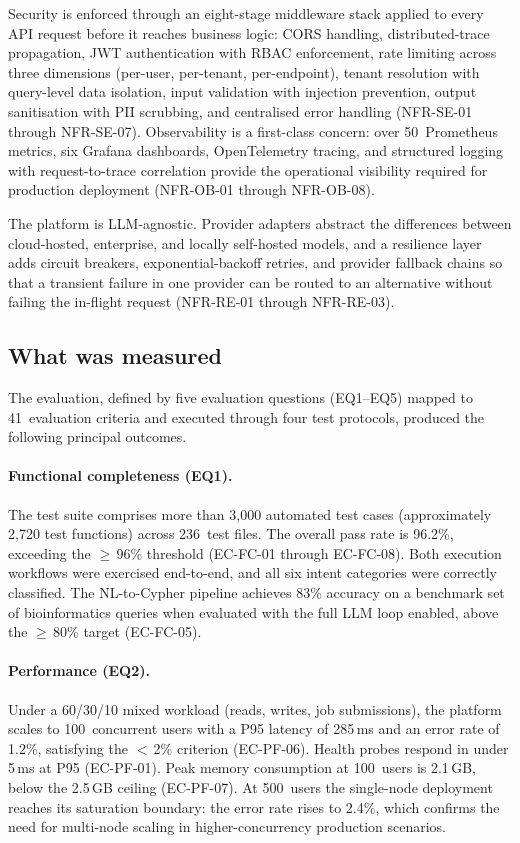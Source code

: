 \documentclass[a4paper]{sapthesis}
\begin{document}
Security is enforced through an eight-stage middleware stack applied to
every API request before it reaches business logic: CORS handling,
distributed-trace propagation, JWT authentication with RBAC enforcement,
rate limiting across three dimensions (per-user, per-tenant,
per-endpoint), tenant resolution with query-level data isolation, input
validation with injection prevention, output sanitisation with PII
scrubbing, and centralised error handling (NFR-SE-01 through NFR-SE-07).
Observability is a first-class concern: over 50~Prometheus metrics, six
Grafana dashboards, OpenTelemetry tracing, and structured logging with
request-to-trace correlation provide the operational visibility required
for production deployment (NFR-OB-01 through NFR-OB-08).

The platform is LLM-agnostic.  Provider adapters abstract the differences
between cloud-hosted, enterprise, and locally self-hosted models, and a
resilience layer adds circuit breakers, exponential-backoff retries, and
provider fallback chains so that a transient failure in one provider can
be routed to an alternative without failing the in-flight request
(NFR-RE-01 through NFR-RE-03).

\subsection{What was measured}

The evaluation, defined by five evaluation questions (EQ1--EQ5) mapped to
41~evaluation criteria and executed through four test protocols, produced
the following principal outcomes.

\paragraph{Functional completeness (EQ1).}
The test suite comprises more than 3{,}000 automated test cases
(approximately 2{,}720 test functions) across 236~test files.  The overall
pass rate is 96.2\%, exceeding the $\geq$\,96\% threshold (EC-FC-01
through EC-FC-08).  Both execution
workflows were exercised end-to-end, and all six intent categories were
correctly classified.  The NL-to-Cypher pipeline achieves 83\% accuracy on
a benchmark set of bioinformatics queries when evaluated with the full LLM
loop enabled, above the $\geq$\,80\% target (EC-FC-05).

\paragraph{Performance (EQ2).}
Under a 60/30/10 mixed workload (reads, writes, job submissions), the
platform scales to 100~concurrent users with a P95 latency of 285\,ms and
an error rate of 1.2\%, satisfying the $<$\,2\% criterion (EC-PF-06).
Health probes respond in under 5\,ms at P95 (EC-PF-01).  Peak memory
consumption at 100~users is 2.1\,GB, below the 2.5\,GB ceiling (EC-PF-07).
At 500~users the single-node deployment reaches its saturation boundary:
the error rate rises to 2.4\%, which confirms the need for multi-node
scaling in higher-concurrency production scenarios.
\end{document}

